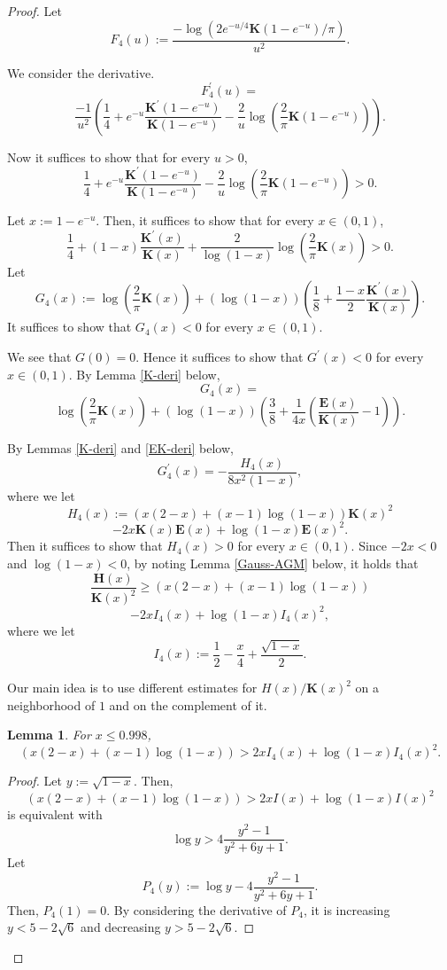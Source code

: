 \documentclass[journal]{IEEEtran}
\newtheorem{lemma}[theorem]{Lemma}
\begin{document}
\begin{proof}
Let
\[ F_4(u) := \frac{-\log\left(2 e^{-u/4} \mathbf{K}(1-e^{-u}) /\pi \right)}{u^2}. \]

We consider the derivative. 
\[ F_4^{\prime}(u) = \]
\[\frac{-1}{u^2} \left( \frac{1}{4} + e^{-u} \frac{\mathbf{K}^{\prime}(1-e^{-u})}{\mathbf{K}(1-e^{-u})} - \frac{2}{u} \log\left(\frac{2}{\pi}\mathbf{K}(1-e^{-u}) \right) \right). \]

Now it suffices to show that for every $u > 0$, 
\[ \frac{1}{4} + e^{-u} \frac{\mathbf{K}^{\prime}(1-e^{-u})}{\mathbf{K}(1-e^{-u})} - \frac{2}{u} \log\left(\frac{2}{\pi}\mathbf{K}(1-e^{-u}) \right) > 0. \] 

Let $x := 1 - e^{-u}$. 
Then, it suffices to show that for every $x \in (0,1)$, 
\[  \frac{1}{4} + (1-x) \frac{\mathbf{K}^{\prime}(x)}{\mathbf{K}(x)} + \frac{2}{\log(1-x)} \log\left(\frac{2}{\pi} \mathbf{K}(x) \right) > 0. \]
Let 
\[ G_4(x) := \log\left(\frac{2}{\pi} \mathbf{K}(x) \right) + (\log(1-x))\left( \frac{1}{8} + \frac{1-x}{2} \frac{\mathbf{K}^{\prime}(x)}{\mathbf{K}(x)}  \right). \]
It suffices to show that $G_4(x) < 0$ for every $x \in (0,1)$. 

We see that $G(0) = 0$. 
Hence it suffices to show that $G^{\prime}(x) < 0$ for every $x \in (0,1)$. 
By Lemma \ref{K-deri} below, 
\[ G_4(x) = \]  
\[\log\left(\frac{2}{\pi} \mathbf{K}(x) \right) + (\log(1-x))\left( \frac{3}{8} + \frac{1}{4x} \left( \frac{\mathbf{E}(x)}{\mathbf{K}(x)} - 1\right) \right). \]

By Lemmas \ref{K-deri} and \ref{EK-deri} below, 
\[ G_4^{\prime}(x) = -\frac{H_4(x)}{8x^2 (1-x)}, \]
where we let 
\[ H_4(x) := (x(2-x) + (x-1)\log(1-x)) \mathbf{K}(x)^2 \] 
\[ -2x \mathbf{K}(x)\mathbf{E}(x) + \log(1-x) \mathbf{E}(x)^2. \]
Then it suffices to show that $H_4(x) > 0$ for every $x \in (0,1)$. 
Since $-2x < 0$ and $ \log(1-x) < 0$, 
by noting Lemma \ref{Gauss-AGM} below, 
it holds that 
\[ \frac{\mathbf{H}(x)}{\mathbf{K}(x)^2} \ge  (x(2-x) + (x-1)\log(1-x))\]
\[ -2x I_4(x) + \log(1-x) I_4(x)^2, \]
where we let 
\[ I_4(x) := \frac{1}{2} - \frac{x}{4} + \frac{\sqrt{1-x}}{2}. \]

Our main idea is to use different estimates for $H(x)/\mathbf{K}(x)^2$ on a neighborhood of $1$ and on the complement of it. 

\begin{lemma}
For $x \le 0.998$, 
\[ (x(2-x) + (x-1)\log(1-x)) > 2x I_4(x) + \log(1-x) I_4(x)^2.\]
\end{lemma}

\begin{proof}
Let $y := \sqrt{1-x}$. 
Then, 
\[ (x(2-x) + (x-1)\log(1-x)) > 2x I(x) + \log(1-x) I(x)^2 \]
is equivalent with 
\[ \log y > 4\frac{y^2 -1}{y^2 + 6y + 1}. \]
Let $$P_4 (y) := \log y - 4\frac{y^2 -1}{y^2 + 6y + 1}.$$ 
Then, $P_4 (1) = 0$. 
By considering the derivative of $P_4 $, 
it is increasing $y < 5 - 2\sqrt{6}$ and decreasing $y > 5 - 2\sqrt{6}$. 


\end{proof}
\end{proof}
\end{document}
